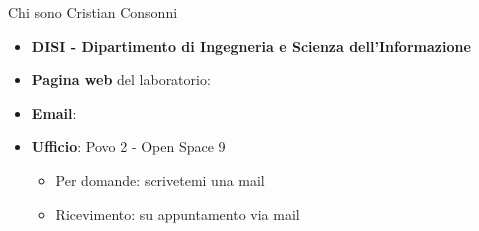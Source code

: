 \begin{frame}{Chi sono}
  Cristian Consonni

  \begin{itemize}
    \item \textbf{DISI - Dipartimento di Ingegneria e Scienza dell'Informazione}
    \item \textbf{Pagina web} del laboratorio: 
    \item \textbf{Email}: 
    \item \textbf{Ufficio}: Povo 2 - Open Space 9
      \begin{itemize}
	\item Per domande: scrivetemi una mail
	\item Ricevimento: su appuntamento via mail
      \end{itemize}
  \end{itemize}
\end{frame}
